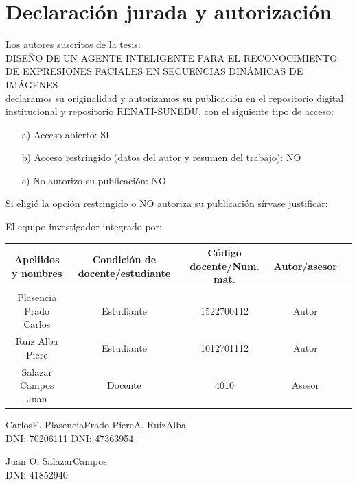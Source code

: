 \chapter*{\hspace*{1cm} Declaración jurada y autorización}

Los autores suscritos de la tesis: \\ 
{\small DISEÑO DE UN AGENTE INTELIGENTE PARA EL RECONOCIMIENTO DE EXPRESIONES FACIALES EN SECUENCIAS DINÁMICAS DE IMÁGENES} \\
declaramos su originalidad y autorizamos su publicación en el repositorio digital institucional y repositorio RENATI-SUNEDU, con el siguiente tipo de acceso:

\begin{enumerate}
\item[a)] Acceso abierto: SI
\item[b)] Acceso restringido (datos del autor y resumen del trabajo): NO
\item[c)] No autorizo su publicación: NO
\end{enumerate}
Si eligió la opción restringido  o NO autoriza su publicación sírvase justificar: 

El equipo investigador integrado por: \\
\hspace{-0.5cm}
\begin{tabular}{|c|c|c|c|c|}
\hline 
Apellidos y nombres & Condición de docente/estudiante & Código docente/Num. mat. & Autor/asesor \\ \hline 
Plasencia Prado Carlos & Estudiante & 1522700112 & Autor  \\ \hline 
Ruiz Alba Piere & Estudiante & 1012701112 & Autor  \\ \hline 
Salazar Campos Juan & Docente & 4010 & Asesor  \\ \hline 
\end{tabular} 
\vskip 1.2cm
\hspace{0.7cm}Carlos\hspace{.1cm}E.\hspace{.1cm} Plasencia\hspace{.1cm}Prado 
\hspace{4cm}Piere\hspace{.1cm}A.\hspace{.1cm} Ruiz\hspace{.1cm}Alba \\
\hspace*{2.6cm} DNI: 70206111  \hspace*{6.6cm}DNI: 47363954


\vskip 0.6cm
\begin{center}
Juan  \hspace{.1cm}O.\hspace{.1cm} Salazar\hspace{.1cm}Campos\\
 DNI: 41852940
\end{center}
